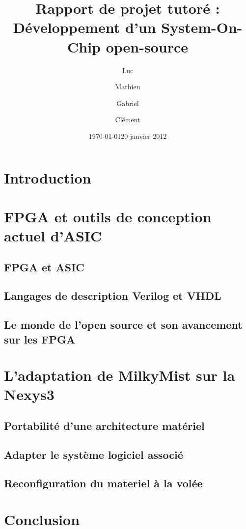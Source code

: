 \documentclass{report}
\date{\today}
\author{}
\title{}
\title{Rapport de projet tutoré : Développement d'un System-On-Chip open-source}
\author{\bsc{DUZAN} Luc \and \bsc{LONGO} Mathieu \and \bsc{FARACHE} Gabriel \and \bsc{MICHAUD} Clément }
\date{20 janvier 2012}
\begin{document}
\maketitle

\tableofcontents

\chapter*{Introduction}

\chapter{FPGA et outils de conception actuel d'ASIC}

\section{FPGA et ASIC}
    

\section{Langages de description Verilog et VHDL}
    

\section{Le monde de l'open source et son avancement sur les FPGA}
    

\chapter{L'adaptation de MilkyMist sur la Nexys3}

\section{Portabilité d'une architecture matériel}
    

\section{Adapter le système logiciel associé}
    

\section{Reconfiguration du materiel à la volée}
    


\chapter*{Conclusion}


\end{document}
